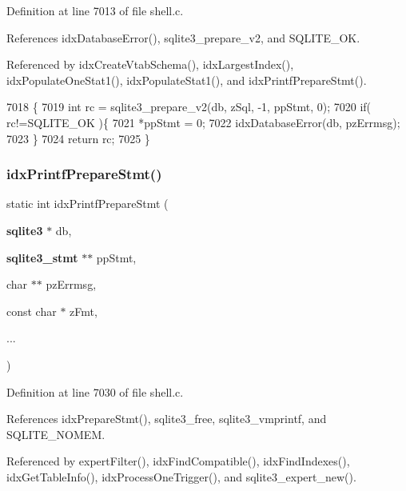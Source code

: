 Definition at line 7013 of file shell.\+c.



References idx\+Database\+Error(), sqlite3\+\_\+prepare\+\_\+v2, and S\+Q\+L\+I\+T\+E\+\_\+\+OK.



Referenced by idx\+Create\+Vtab\+Schema(), idx\+Largest\+Index(), idx\+Populate\+One\+Stat1(), idx\+Populate\+Stat1(), and idx\+Printf\+Prepare\+Stmt().


\begin{DoxyCode}
7018  \{
7019   \textcolor{keywordtype}{int} rc = sqlite3_prepare_v2(db, zSql, -1, ppStmt, 0);
7020   \textcolor{keywordflow}{if}( rc!=SQLITE_OK )\{
7021     *ppStmt = 0;
7022     idxDatabaseError(db, pzErrmsg);
7023   \}
7024   \textcolor{keywordflow}{return} rc;
7025 \}
\end{DoxyCode}
\mbox{\label{shell_8c_ae40fe101378f0ab167164c95cced70ba}} 
\subsubsection{idx\+Printf\+Prepare\+Stmt()}
{\footnotesize\ttfamily static int idx\+Printf\+Prepare\+Stmt (\begin{DoxyParamCaption}\item[{\textbf{ sqlite3} $\ast$}]{db,  }\item[{\textbf{ sqlite3\+\_\+stmt} $\ast$$\ast$}]{pp\+Stmt,  }\item[{char $\ast$$\ast$}]{pz\+Errmsg,  }\item[{const char $\ast$}]{z\+Fmt,  }\item[{}]{... }\end{DoxyParamCaption})\hspace{0.3cm}{\ttfamily [static]}}



Definition at line 7030 of file shell.\+c.



References idx\+Prepare\+Stmt(), sqlite3\+\_\+free, sqlite3\+\_\+vmprintf, and S\+Q\+L\+I\+T\+E\+\_\+\+N\+O\+M\+EM.



Referenced by expert\+Filter(), idx\+Find\+Compatible(), idx\+Find\+Indexes(), idx\+Get\+Table\+Info(), idx\+Process\+One\+Trigger(), and sqlite3\+\_\+expert\+\_\+new().


